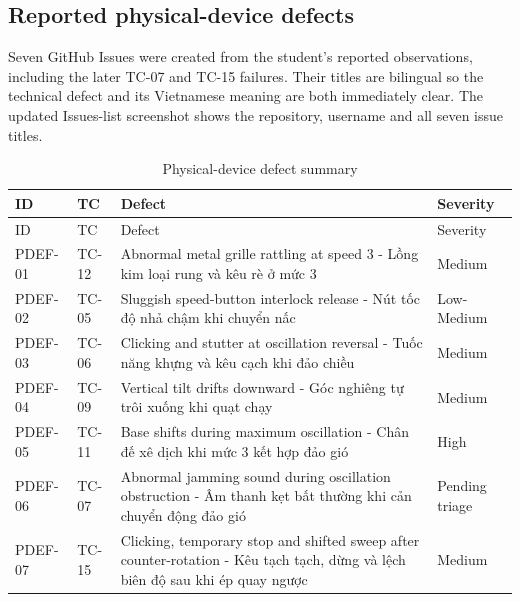 \subsection{Reported physical-device defects}

Seven GitHub Issues were created from the student's reported observations, including the later TC-07 and TC-15 failures. Their titles are bilingual so the technical defect and its Vietnamese meaning are both immediately clear. The updated Issues-list screenshot shows the repository, username and all seven issue titles.

\begin{longtable}{p{}p{}p{}p{}}

\caption{Physical-device defect summary}\\\toprule

ID & TC & Defect & Severity \\\midrule\endfirsthead

\toprule ID & TC & Defect & Severity \\\midrule\endhead

PDEF-01 & TC-12 & Abnormal metal grille rattling at speed 3 - Lồng kim loại rung và kêu rè ở mức 3 & Medium \\

PDEF-02 & TC-05 & Sluggish speed-button interlock release - Nút tốc độ nhả chậm khi chuyển nấc & Low-Medium \\

PDEF-03 & TC-06 & Clicking and stutter at oscillation reversal - Tuốc năng khựng và kêu cạch khi đảo chiều & Medium \\

PDEF-04 & TC-09 & Vertical tilt drifts downward - Góc nghiêng tự trôi xuống khi quạt chạy & Medium \\

PDEF-05 & TC-11 & Base shifts during maximum oscillation - Chân đế xê dịch khi mức 3 kết hợp đảo gió & High \\

PDEF-06 & TC-07 & Abnormal jamming sound during oscillation obstruction - Âm thanh kẹt bất thường khi cản chuyển động đảo gió & Pending triage \\

PDEF-07 & TC-15 & Clicking, temporary stop and shifted sweep after counter-rotation - Kêu tạch tạch, dừng và lệch biên độ sau khi ép quay ngược & Medium \\

\bottomrule\end{longtable}

